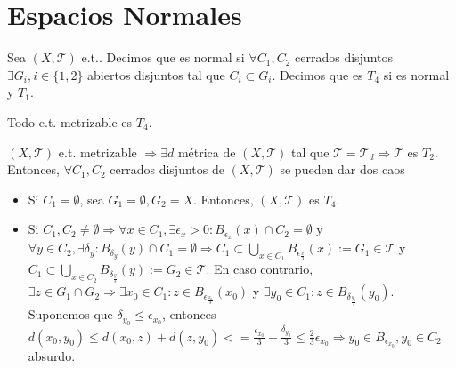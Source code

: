 \section{Espacios Normales}

\begin{defn}[Normal]
  Sea $( X, \mathcal{T} )$ e.t.. Decimos que es normal si $\forall C_{1}, C_{2}$ cerrados disjuntos $ \exists G_{i}, i \in \{  1, 2 \}$ abiertos disjuntos tal que $ C_{i} \subset G_{i}$. Decimos que es $T_{4}$ si es normal y $T_{1}$.
\end{defn}

\begin{prop}
  Todo e.t. metrizable es $T_{4}$.
\end{prop}

\begin{dem}
  $( X, \mathcal{T} )$ e.t. metrizable $\Rightarrow \exists d$ métrica de $( X, \mathcal{T} )$ tal que $\mathcal{T} = \mathcal{T}_{d} \Rightarrow \mathcal{T}$ es $T_{2}$. Entonces, $\forall C_{1}, C_{2}$ cerrados disjuntos de $( X, \mathcal{T} )$ se pueden dar dos caos
  \begin{itemize}
    \item Si $C_{1} = \emptyset$, sea $G_{1} = \emptyset, G_{2} = X$. Entonces, $( X, \mathcal{T} )$ es $T_{4}$.
    \item Si $C_{1}, C_{2} \neq \emptyset \Rightarrow \forall x \in C_{1}, \exists \epsilon_{x} > 0: B_{\epsilon_{x}}(x) \cap C_{2} = \emptyset$ y $\forall y \in C_{2}, \exists \delta_{y}: B_{\delta_{y}}(y) \cap C_{1} = \emptyset \Rightarrow C_{1} \subset \bigcup_{x \in C_{1}} B_{\epsilon_{\frac{x}{3}}}(x) := G_{1} \in \mathcal{T}$ y $C_{1} \subset \bigcup_{x \in C_{2}} B_{\delta_{\frac{y}{3}}}(y) := G_{2} \in \mathcal{T}$. En caso contrario, $\exists z \in G_{1} \cap G_{2} \Rightarrow \exists x_{0} \in C_{1} : z \in B_{\epsilon_{\frac{x_{0}}{3}}}(x_{0})$ y $\exists y_{0} \in C_{1} : z \in B_{\delta_{\frac{y_{0}}{3}}}(y_{0})$. Suponemos que $\delta_{y_{0}} \leq \epsilon_{x_{0}}$, entonces $ d(x_{0}, y_{0}) \leq d(x_{0}, z) + d(z, y_{0}) < = \frac{\epsilon_{x_{0}}}{3} + \frac{\delta_{y_{0}}}{3} \leq \frac{2}{3}\epsilon_{x_{0}} \Rightarrow y_{0} \in B_{\epsilon_{x_{0}}}, y_{0} \in C_{2}$ absurdo.
  \end{itemize}
\end{dem}


